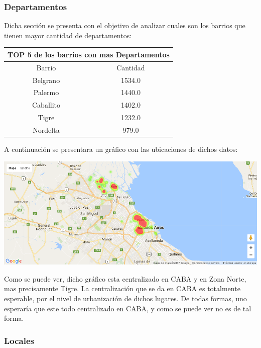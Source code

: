 \documentclass[a4paper, 10pt]{article}
\begin{document}
				\subsubsection{Departamentos}
				
				Dicha sección se presenta con el objetivo de analizar cuales son los barrios que tienen mayor cantidad de departamentos:
				
				\begin{center}
						\begin{tabular}{ |c|c| }
							\hline
							\multicolumn{2}{|c|}{TOP 5 de los barrios con mas Departamentos}\\
							\hline
							\hline
							Barrio & Cantidad\\
							\hline
							Belgrano & 1534.0 \\
							Palermo & 1440.0 \\
							Caballito &	1402.0 \\
							Tigre &	1232.0 \\
							Nordelta & 979.0 \\
							\hline
						\end{tabular}
					\end{center}
				
				A continuación se presentara un gráfico con las ubicaciones de dichos datos:
				
				\begin{center}
   		    				\includegraphics[width=\textwidth]{images/ubicMDeptos}
				\end{center}
				
				Como se puede ver, dicho gráfico esta centralizado en CABA y en Zona Norte, mas precisamente Tigre. La centralización que se da en CABA es totalmente esperable, por el nivel de urbanización de dichos lugares. De todas formas, uno esperaría que este todo centralizado en CABA, y como se puede ver no es de tal forma.
				
				\subsubsection{Locales}
				
\end{document}
